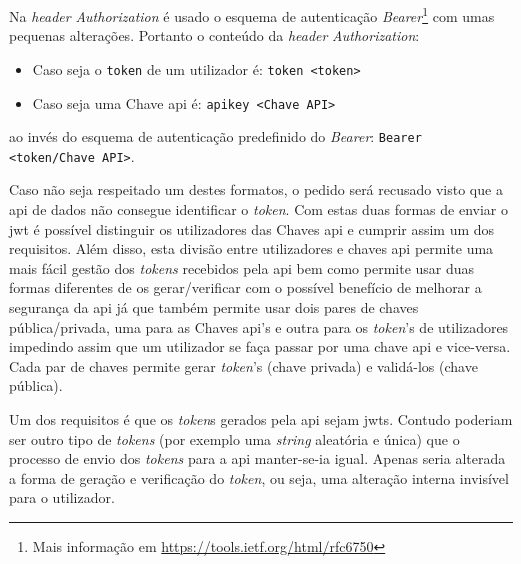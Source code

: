 Na \textit{header} \textit{Authorization} é usado o esquema de autenticação \textit{Bearer}\footnote{Mais informação em \url{https://tools.ietf.org/html/rfc6750}} com umas pequenas alterações. Portanto o conteúdo da \textit{header} \textit{Authorization}:
\begin{itemize}[leftmargin=2cm]
    \item Caso seja o \texttt{token} de um utilizador é:\newline
        \verb|token <token>|
    \item Caso seja uma Chave \acrshort{api} é:\newline
        \verb|apikey <Chave API>|
\end{itemize}
ao invés do esquema de autenticação predefinido do \textit{Bearer}: \verb|Bearer <token/Chave API>|.

Caso não seja respeitado um destes formatos, o pedido será recusado visto que a \acrshort{api} de dados não consegue identificar o \textit{token}.
Com estas duas formas de enviar o \acrshort{jwt} é possível distinguir os utilizadores das Chaves \acrshort{api} e cumprir assim um dos requisitos. Além disso, esta divisão entre utilizadores e chaves \acrshort{api} permite uma mais fácil gestão dos \textit{tokens} recebidos pela \acrshort{api} bem como permite usar duas formas diferentes de os gerar/verificar com o possível benefício de melhorar a segurança da \acrshort{api} já que também permite usar dois pares de chaves pública/privada, uma para as Chaves \acrshort{api}'s e outra para os \textit{token}'s de utilizadores impedindo assim que um utilizador se faça passar por uma chave \acrshort{api} e vice-versa. Cada par de chaves permite gerar \textit{token}'s (chave privada) e validá-los (chave pública).

Um dos requisitos é que os \textit{token}s gerados pela \acrshort{api} sejam \acrshort{jwt}s. Contudo poderiam ser outro tipo de \textit{tokens} (por exemplo uma \textit{string} aleatória e única) que o processo de envio dos \textit{tokens} para a \acrshort{api} manter-se-ia igual. Apenas seria alterada a forma de geração e verificação do \textit{token}, ou seja, uma alteração interna invisível para o utilizador.

